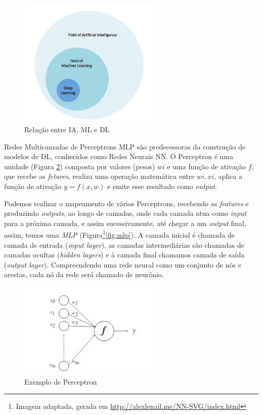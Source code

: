 \begin{figure}[!h]
\centering
\includegraphics[width=0.6\textwidth]{img/ia-ml-dl.JPG}
\caption{\label{fig:ia-ml-dl}Relação entre \acrshort{IA}, \acrshort{ML} e \acrshort{DL}}

\author{Fonte: Retirada de~\cite{58}}
\end{figure}

Redes Multicamadas de Perceptrons \acrlong{MLP} são predecessoras da construção de modelos de \acrshort{DL}, conhecidos como Redes Neurais \acrlong{NN}. O Perceptron é uma unidade (Figura \ref{fig:perceptron}) composta por valores (pesos) $wi$ e uma função de ativação $f$,  que recebe as \textit{fetures}, realiza uma operação matemática entre $wi,xi$, aplica a função de ativação $y = f(x,w)$ e emite esse resultado como \textit{output}.

Podemos realizar o mapeamento de vários Perceptrons, recebendo as \textit{features} e produzindo \textit{outputs}, ao longo de camadas, onde cada camada atua como \textit{input} para a próxima camada, e assim sucessivamente, até chegar a
 um \textit{output} final, assim, temos uma \textit{MLP} (Figura\footnote{Imagem adaptada, gerada em \url{http://alexlenail.me/NN-SVG/index.html}}\ref{fig:mlp}).
 A camada inicial é chamada de camada de entrada (\textit{input layer}), as camadas intermediárias são chamadas de camadas ocultas (\textit{hidden layers}) e à camada final chamamos camada de saída (\textit{output layer}). Compreendendo uma rede neural como um conjunto de nós e arestas, cada nó da rede será chamado de neurônio.

\begin{figure}[!ht]
\centering
\includegraphics[width=0.6\textwidth]{img/perceptron.png}
\caption{\label{fig:perceptron}Exemplo de Perceptron}

\author{Fonte: Retirado de~\cite{12}}
\end{figure}

